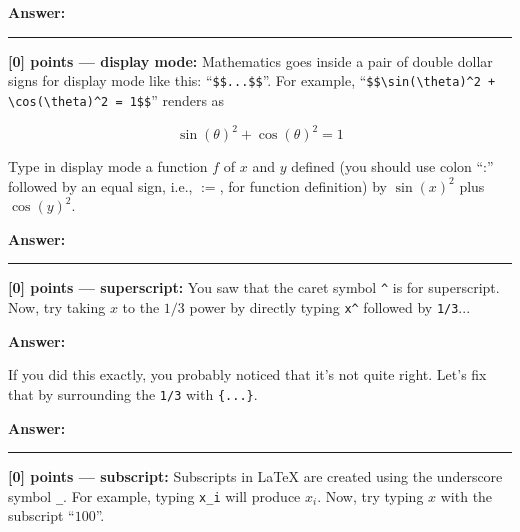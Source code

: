 \documentclass{article}
\newcommand{\mydivider}{\vspace{1em}\hrule\vspace{1em}}
\begin{document}
\begin{tcolorbox}{}
\textbf{Answer: }



\end{tcolorbox}


\mydivider
\noindent\textbf{[0] points --- display mode:} Mathematics goes inside a pair of double dollar signs for display mode like this: ``\verb|$$...$$|''. For example,
``\verb|$$\sin(\theta)^2 + \cos(\theta)^2 = 1$$|'' renders as

$$\sin(\theta)^2 + \cos(\theta)^2 = 1$$

 Type in display mode a function $f$ of $x$ and $y$ defined (you should use colon ``:'' followed by an equal sign, i.e., $:=$, for function definition) by $\sin(x)^2$ plus $\cos(y)^2$.


\begin{tcolorbox}{}
\textbf{Answer: }


\end{tcolorbox}




\mydivider
\noindent\textbf{[0] points --- superscript:} You saw that the caret symbol \verb|^| is for superscript. Now, try taking $x$ to the $1/3$ power by directly typing \verb|x^| followed by \verb|1/3|...

\begin{tcolorbox}{}
\textbf{Answer: }


\end{tcolorbox}

If you did this exactly, you probably noticed that it's not quite right. Let's fix that by surrounding the \verb|1/3| with \verb|{...}|.

\begin{tcolorbox}{}
\textbf{Answer: }


\end{tcolorbox}



\mydivider

\noindent\textbf{[0] points --- subscript:} Subscripts in LaTeX are created using the underscore symbol \verb|_|. For example, typing \verb|x_i| will produce $x_i$. Now, try typing $x$ with the subscript ``$100$''.
\end{document}
